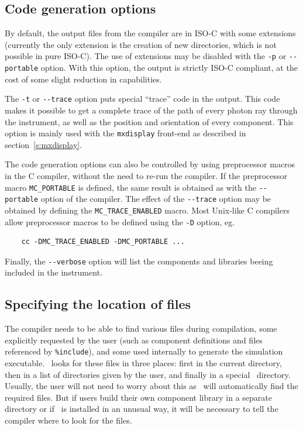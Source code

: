 \subsection{Code generation options}

By default, the output files from the \MCX compiler are in ISO-C with
some extensions (currently the only extension is the creation of new
directories, which is not possible in pure ISO-C). The use of
extensions may be disabled with the \verb+-p+ or \verb+--portable+
option. With this option, the output is strictly ISO-C compliant, at
the cost of some slight reduction in capabilities.

The \verb+-t+ or \verb+--trace+ option puts special ``trace'' code in
the output. This code makes it possible to get a complete trace of the
path of every photon ray through the instrument, as well as the position
and orientation of every component. This option is mainly used with the
\verb+mxdisplay+ front-end as described in section~\ref{s:mxdisplay}.

The code generation options can also be controlled by using preprocessor
macros in the C compiler, without the need to re-run the \MCX
compiler. If the preprocessor macro \verb+MC_PORTABLE+ is defined, the
same result is obtained as with the \verb+--portable+ option of the
\MCX compiler. The effect of the \verb+--trace+ option may be obtained
by defining the \verb+MC_TRACE_ENABLED+ macro. Most Unix-like C
compilers allow preprocessor macros to be defined using the \verb+-D+
option, eg.
\begin{verbatim}
    cc -DMC_TRACE_ENABLED -DMC_PORTABLE ...
\end{verbatim}
Finally, the \verb+--verbose+ option will list the components and libraries beeing
included in the instrument.

\subsection{Specifying the location of files}
\label{s:files}

The \MCX compiler needs to be able to find various files during
compilation, some explicitly requested by the user (such as component
definitions and files referenced by \verb+%include+), 
and some used internally to generate the simulation executable. \MCX\ looks for these
files in three places: first in the current directory, then in a list of
directories given by the user, and finally in a special \MCX\
directory. Usually, the user will not need to worry about this as \MCX\
will automatically find the required files. But if users build their own
component library in a separate directory or if \MCX\ is installed in an
unusual way, it will be necessary to tell the compiler where to look
for the files.

